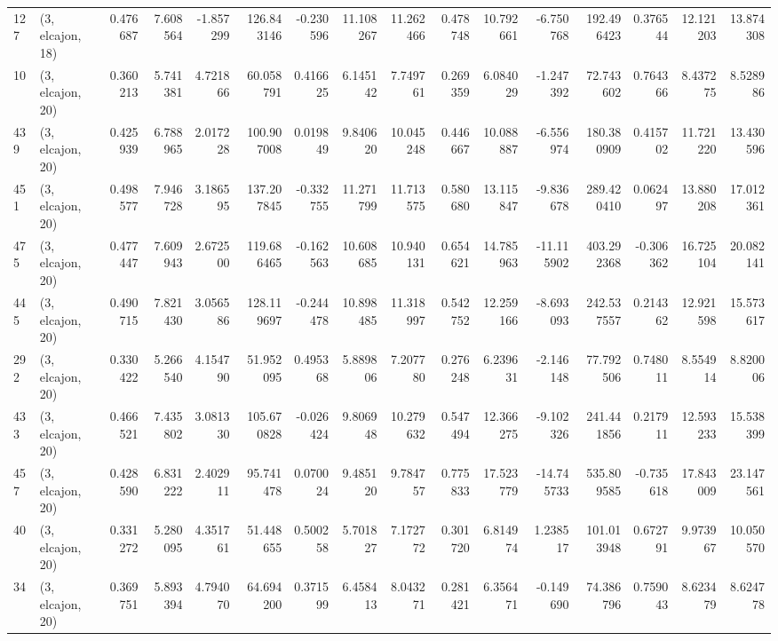 \begin{tabular}{llrrrrrrrrrrrrrr}
127 &  (3, elcajon, 18) &   0.476687 &   7.608564 &  -1.857299 &   126.843146 &  -0.230596 &  11.108267 &  11.262466 &  0.478748 &  10.792661 &  -6.750768 &   192.496423 &   0.376544 &  12.121203 &  13.874308 \\
10  &  (3, elcajon, 20) &   0.360213 &   5.741381 &   4.721866 &    60.058791 &   0.416625 &   6.145142 &   7.749761 &  0.269359 &   6.084029 &  -1.247392 &    72.743602 &   0.764366 &   8.437275 &   8.528986 \\
439 &  (3, elcajon, 20) &   0.425939 &   6.788965 &   2.017228 &   100.907008 &   0.019849 &   9.840620 &  10.045248 &  0.446667 &  10.088887 &  -6.556974 &   180.380909 &   0.415702 &  11.721220 &  13.430596 \\
451 &  (3, elcajon, 20) &   0.498577 &   7.946728 &   3.186595 &   137.207845 &  -0.332755 &  11.271799 &  11.713575 &  0.580680 &  13.115847 &  -9.836678 &   289.420410 &   0.062497 &  13.880208 &  17.012361 \\
475 &  (3, elcajon, 20) &   0.477447 &   7.609943 &   2.672500 &   119.686465 &  -0.162563 &  10.608685 &  10.940131 &  0.654621 &  14.785963 & -11.115902 &   403.292368 &  -0.306362 &  16.725104 &  20.082141 \\
445 &  (3, elcajon, 20) &   0.490715 &   7.821430 &   3.056586 &   128.119697 &  -0.244478 &  10.898485 &  11.318997 &  0.542752 &  12.259166 &  -8.693093 &   242.537557 &   0.214362 &  12.921598 &  15.573617 \\
292 &  (3, elcajon, 20) &   0.330422 &   5.266540 &   4.154790 &    51.952095 &   0.495368 &   5.889806 &   7.207780 &  0.276248 &   6.239631 &  -2.146148 &    77.792506 &   0.748011 &   8.554914 &   8.820006 \\
433 &  (3, elcajon, 20) &   0.466521 &   7.435802 &   3.081330 &   105.670828 &  -0.026424 &   9.806948 &  10.279632 &  0.547494 &  12.366275 &  -9.102326 &   241.441856 &   0.217911 &  12.593233 &  15.538399 \\
457 &  (3, elcajon, 20) &   0.428590 &   6.831222 &   2.402911 &    95.741478 &   0.070024 &   9.485120 &   9.784757 &  0.775833 &  17.523779 & -14.745733 &   535.809585 &  -0.735618 &  17.843009 &  23.147561 \\
40  &  (3, elcajon, 20) &   0.331272 &   5.280095 &   4.351761 &    51.448655 &   0.500258 &   5.701827 &   7.172772 &  0.301720 &   6.814974 &   1.238517 &   101.013948 &   0.672791 &   9.973967 &  10.050570 \\
34  &  (3, elcajon, 20) &   0.369751 &   5.893394 &   4.794070 &    64.694200 &   0.371599 &   6.458413 &   8.043271 &  0.281421 &   6.356471 &  -0.149690 &    74.386796 &   0.759043 &   8.623479 &   8.624778 \\

\end{tabular}

